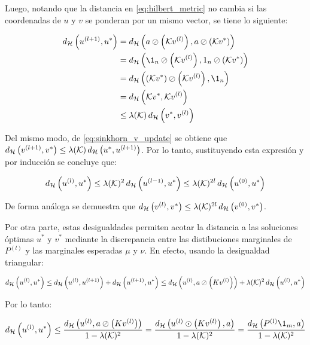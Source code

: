 Luego, notando que la distancia en \eqref{eq:hilbert_metric} no cambia si las coordenadas de $u$ y $v$ se ponderan por un mismo vector, se tiene lo siguiente:

\begin{align*}
	\hmetric{u^{(l+1)}}{u^*} &= \hmetric{a \oslash \parent{\gibbs v^{(l)}}}{a \oslash \parent{\gibbs v^*}}\\
	&= \hmetric{\1_n \oslash \parent{\gibbs v^{(l)}}}{1_n \oslash \parent{\gibbs v^*}}\\
	&= \hmetric{\parent{\gibbs v^*} \oslash \parent{\gibbs v^{(l)}}}{\1_n}\\
	&= \hmetric{\gibbs v^*}{\gibbs v^{(l)}}\\
	&\leq \lambda(\gibbs)\, \hmetric{v^*}{v^{(l)}}
\end{align*}

Del mismo modo, de \eqref{eq:sinkhorn_v_update} se obtiene que $d_{\mathcal{H}}\left(v^{(l+1)},v^*\right) \leq \lambda(\mathcal{K})\, d_{\mathcal{H}}\left(u^*,u^{(l+1)}\right)$. Por lo tanto, sustituyendo esta expresión y por inducción se concluye que:

\begin{equation*}
	d_{\mathcal{H}}\left(u^{(l)},u^*\right)
	\leq \lambda(\mathcal{K})^2\, d_{\mathcal{H}}\left(u^{(l-1)},u^*\right)
	\leq \lambda(\mathcal{K})^{2l}\, d_{\mathcal{H}}\left(u^{(0)},u^*\right)
\end{equation*}

De forma análoga se demuestra que $d_{\mathcal{H}}\left(v^{(l)},v^*\right) \leq \lambda(\mathcal{K})^{2l}\, d_{\mathcal{H}}\left(v^{(0)},v^*\right)$.

Por otra parte, estas desigualdades permiten acotar la distancia a las soluciones óptimas $u^*$ y $v^*$ mediante la discrepancia entre las distibuciones marginales de $P^{(l)}$ y las marginales esperadas $\mu$ y $\nu$. En efecto, usando la desigualdad triangular:

\begin{equation*}
	d_{\mathcal{H}}\left(u^{(l)},u^*\right)
	\leq d_{\mathcal{H}}\left(u^{(l)},u^{(l+1)}\right) + d_{\mathcal{H}}\left(u^{(l+1)},u^*\right)
	\leq d_{\mathcal{H}}\left(u^{(l)},a\oslash \left(Kv^{(l)}\right)\right) + \lambda(\mathcal{K})^2\, d_{\mathcal{H}}\left(u^{(l)},u^*\right)
\end{equation*}

Por lo tanto:

\begin{equation*}
	\hmetric{u^{(l)}}{u^*}
	\leq \frac{\hmetric{u^{(l)}}{a\oslash \parent{Kv^{(l)}}}}{1-\lambda(\gibbs)^2}
	= \frac{\hmetric{u^{(l)}\odot \parent{Kv^{(l)}}}{a}}{1-\lambda(\gibbs)^2}
	= \frac{\hmetric{P^{(l)}\1_m}{a}}{1-\lambda(\gibbs)^2}
\end{equation*}

